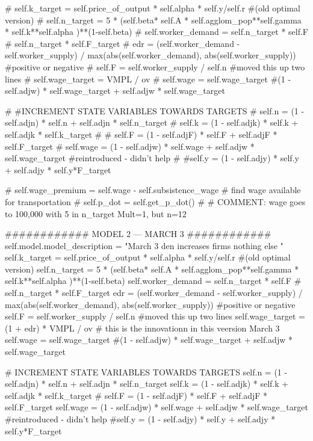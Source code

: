         # self.k_target = self.price_of_output * self.alpha * self.y/self.r     #(old optimal version)
        # self.n_target   = 5 * (self.beta* self.A * self.agglom_pop**self.gamma *  self.k**self.alpha )**(1-self.beta) 
        # self.worker_demand = self.n_target * self.F # self.n_target * self.F_target
        # edr = (self.worker_demand - self.worker_supply) / max(abs(self.worker_demand), abs(self.worker_supply)) #positive or negative 
        # self.F = self.worker_supply / self.n  #moved this up two lines
        # self.wage_target =  VMPL / ov
        # self.wage        = self.wage_target  #(1 - self.adjw) * self.wage_target + self.adjw * self.wage_target
        
        # #INCREMENT STATE VARIABLES TOWARDS TARGETS
        # self.n        = (1 - self.adjn) * self.n + self.adjn * self.n_target
        # self.k        = (1 - self.adjk) * self.k + self.adjk * self.k_target 
        # # self.F      = (1 - self.adjF) * self.F + self.adjF * self.F_target
        # self.wage     = (1 - self.adjw) * self.wage + self.adjw * self.wage_target  #reintroduced  - didn't help
        # #self.y       = (1 - self.adjy) * self.y + self.adjy * self.y*F_target 

        # self.wage_premium     = self.wage - self.subsistence_wage # find wage available for transportation
        # self.p_dot            = self.get_p_dot()
        # # COMMENT: wage goes to 100,000 with 5 in n_target  Mult=1, but n=12
      
     ############   MODEL 2  --- MARCH 3   ############ 
        self.model.model_description = "March 3 den increases firms nothing else "
        self.k_target = self.price_of_output * self.alpha * self.y/self.r     #(old optimal version)
        self.n_target   = 5 * (self.beta* self.A * self.agglom_pop**self.gamma *  self.k**self.alpha )**(1-self.beta) 
        self.worker_demand = self.n_target * self.F # self.n_target * self.F_target
        edr = (self.worker_demand - self.worker_supply) / max(abs(self.worker_demand), abs(self.worker_supply)) #positive or negative 
        self.F = self.worker_supply / self.n  #moved this up two lines
        self.wage_target = (1 + edr) * VMPL / ov  # this is the innovationn in this veersion March 3
        self.wage        = self.wage_target  #(1 - self.adjw) * self.wage_target + self.adjw * self.wage_target
        
        # INCREMENT STATE VARIABLES TOWARDS TARGETS 
        self.n        = (1 - self.adjn) * self.n + self.adjn * self.n_target
        self.k        = (1 - self.adjk) * self.k + self.adjk * self.k_target 
        # self.F        = (1 - self.adjF) * self.F + self.adjF * self.F_target
        self.wage     = (1 - self.adjw) * self.wage + self.adjw * self.wage_target  #reintroduced  - didn't help
        #self.y        = (1 - self.adjy) * self.y + self.adjy * self.y*F_target 

